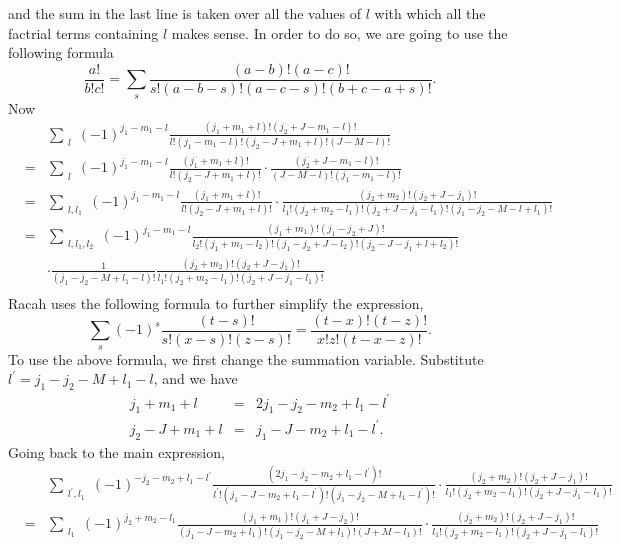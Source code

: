 \documentclass{article}
\begin{document}
and the sum in the last line is taken over all the values of $l$ with which all the factrial terms containing $l$ makes sense. In order to do so, we are going to use the following formula
\begin{equation}
\label{}
\frac{a!}{b!c!}= \sum_{s} \frac{(a-b)!(a-c)!}{s!(a-b-s)!(a-c-s)!(b+c-a+s)!}.
\end{equation}
Now
\begin{eqnarray}
& &\sum_{\substack{l}} (-1)^{j_1 -m_1 -l} \frac{(j_1+m_1+l)!(j_2+J-m_1-l)!}{l!(j_1-m_1-l)!(j_2-J+m_1+l)!(J-M-l)!}   \nonumber\\
& = &  \sum_{\substack{l}} (-1)^{j_1 -m_1 -l} \frac{(j_1+m_1+l)!}{l!(j_2-J+m_1+l)!}\cdot\frac{(j_2+J-m_1-l)!}{(J-M-l)!(j_1-m_1-l)!} \nonumber\\
& = &  \sum_{\substack{l,l_1}} (-1)^{j_1 -m_1 -l} \frac{(j_1+m_1+l)!}{l!(j_2-J+m_1+l)!}\cdot\frac{(j_2+m_2)!(j_2+J-j_1)!}{l_1!(j_2+m_2-l_1)!(j_2+J-j_1-l_1)!(j_1-j_2-M-l+l_1)!} \nonumber\\
& = &  \sum_{\substack{l,l_1, l_2}} (-1)^{j_1 -m_1 -l} \frac{(j_1+m_1)! (j_1 - j_2 +J)!}{l_2!(j_1+m_1-l_2)! (j_1-j_2+J-l_2)! (j_2-J-j_1+l+l_2)!}  \nonumber\\
& & \cdot \frac{1}{(j_1-j_2-M+l_1-l)!} \frac{(j_2+m_2)!(j_2+J-j_1)!}{l_1!(j_2+m_2-l_1)!(j_2+J-j_1-l_1)!} \nonumber\\
\end{eqnarray}
Racah uses the following formula to further simplify the expression,
\begin{equation}
\label{}
\sum_{s} (-1)^{s}\frac{(t-s)!}{s!(x-s)!(z-s)!}= \frac{(t-x)!(t-z)!}{x!z!(t-x-z)!}.
\end{equation}
To use the above formula, we first change the summation variable. Substitute $l^{\prime} =j_1-j_2 - M +l_1 - l$, and we have
\begin{eqnarray}
j_1+m_1+l & = & 2j_1 - j_2 - m_2 + l_1 - l^{\prime} \nonumber\\
j_2-J+m_1+l & = & j_1 - J - m_2 + l_1 - l^{\prime}.  \nonumber
\end{eqnarray}
Going back to the main expression,
\begin{eqnarray}
& &  \sum_{\substack{l^{\prime},l_1}} (-1)^{-j_2 - m_2 +l_1 -l^{\prime}} \frac{(2j_1 - j_2 - m_2 + l_1 - l^{\prime} )!}{l^{\prime}!(j_1 - J - m_2 + l_1 - l^{\prime} )!(j_1-j_2-M+l_1-l^{\prime})!}\cdot\frac{(j_2+m_2)!(j_2+J-j_1)!}{l_1!(j_2+m_2-l_1)!(j_2+J-j_1-l_1)!} \nonumber\\
&=&  \sum_{\substack{l_1}} (-1)^{j_2 + m_2 -l_1} \frac{(j_1+m_1)!(j_1+J-j_2)!}{(j_1 - J - m_2 + l_1)!(j_1 - j_2 - M + l_1)!(J + M - l_1)!}\cdot\frac{(j_2+m_2)!(j_2+J-j_1)!}{l_1!(j_2+m_2-l_1)!(j_2+J-j_1-l_1)!} \nonumber
\end{eqnarray}
\end{document}
